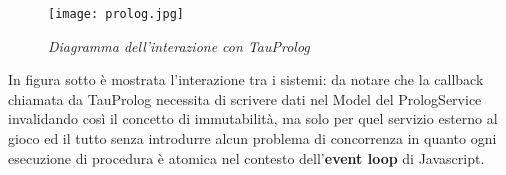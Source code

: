 \begin{figure}[!hbt]
    \centering
    \texttt{[image: prolog.jpg]}
    \caption{\textit{Diagramma dell'interazione con TauProlog}} 
\end{figure}

In figura sotto è mostrata l'interazione tra i sistemi: da notare che la callback chiamata da TauProlog necessita di scrivere dati nel Model del PrologService invalidando così il concetto di immutabilità, ma solo per quel servizio esterno al gioco ed il tutto senza introdurre alcun problema di concorrenza in quanto ogni esecuzione di procedura è atomica nel contesto dell'\textbf{event loop} di Javascript.


